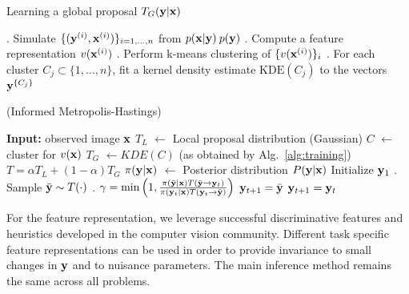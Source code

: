     \begin{algorithm}[t]
      \caption{Learning a global proposal $T_G(\mathbf{y}|\mathbf{x})$}
      \label{alg:training}
      \begin{algorithmic}
        . Simulate $\{(\mathbf{y}^{(i)},\mathbf{x}^{(i)})\}_{i=1,\dots,n}$
        from $p(\mathbf{x}|\mathbf{y}) \: p(\mathbf{y})$ . Compute a feature
        representation $v(\mathbf{x}^{(i)})$ . Perform k-means
        clustering of $\{v(\mathbf{x}^{(i)})\}_i$
        . For each cluster $C_j \subset \{1,\dots,n\}$, fit a kernel
        density estimate $\textrm{KDE}(C_j)$ to the vectors
        $\mathbf{y}^{\{C_j\}}$
      \end{algorithmic}
    \end{algorithm}

    \begin{algorithm}[t]
      \caption{\MIXLMH (Informed Metropolis-Hastings)}
      \label{alg:sampling}
      \begin{algorithmic}
        \STATE \textbf{Input:} observed image $\mathbf{x}$ \STATE $T_L$
        $\leftarrow$ Local proposal distribution (Gaussian) \STATE $C$
        $\leftarrow$ cluster for $v(\mathbf{x})$ \STATE $T_G$ $\leftarrow
        KDE(C)$ (as obtained by Alg.~\ref{alg:training}) \STATE $T =
        \alpha T_L + (1-\alpha) T_G$
        \STATE $\pi(\mathbf{y}|\mathbf{x})$ $\leftarrow$ Posterior distribution $P(\mathbf{y}|\mathbf{x})$
        \STATE Initialize $\mathbf{y}_1$
        . Sample $\bar{\mathbf{y}} \sim T(\cdot)$
        . $\gamma =
        \min\left(1,\frac{\pi(\bar{\mathbf{y}}|\mathbf{x}) T(\bar{\mathbf{y}} \to
          \mathbf{y}_t)}{\pi(\mathbf{y}_t|\mathbf{x}) T(\mathbf{y}_t \to
          \bar{\mathbf{y}})} \right)$
        \STATE $\mathbf{y}_{t+1} = \bar{\mathbf{y}}$
        \ELSE
        \STATE $\mathbf{y}_{t+1} = \mathbf{y}_t$
        \ENDIF
        \ENDFOR
      \end{algorithmic}
    \end{algorithm}
For the feature representation, we leverage successful discriminative
features and heuristics developed in the computer vision community. Different
task specific feature representations can be used in order to provide
invariance to small changes in $\mathbf{y}$ and to nuisance parameters.
The main inference method remains the same across all problems.

